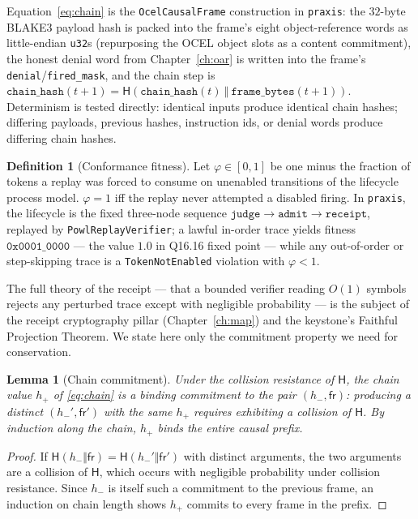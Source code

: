 \documentclass[11pt,oneside]{book}
\theoremstyle{definition}
\newtheorem{definition}{Definition}[chapter]
\theoremstyle{plain}
\newtheorem{lemma}[theorem]{Lemma}
\theoremstyle{remark}
\newcommand{\chainH}{\mathsf{H}}               %
\newcommand{\Fitness}{\varphi}
\newcommand{\code}[1]{\texttt{#1}}
\begin{document}
Equation~\eqref{eq:chain} is the \code{OcelCausalFrame} construction in \code{praxis}: the
$32$-byte BLAKE3 payload hash is packed into the frame's eight object-reference words as
little-endian \code{u32}s (repurposing the OCEL \cite{ocel2020} object slots as a content
commitment), the honest denial word from Chapter~\ref{ch:oar} is written into the frame's
\code{denial}/\code{fired\_mask}, and the chain step is
$\code{chain\_hash}(t{+}1)=\chainH(\code{chain\_hash}(t)\ \Vert\ \code{frame\_bytes}(t{+}1))$.
Determinism is tested directly: identical inputs produce identical chain hashes; differing
payloads, previous hashes, instruction ids, or denial words produce differing chain hashes.

\begin{definition}[Conformance fitness]\label{def:fit}
Let $\Fitness\in[0,1]$ be one minus the fraction of tokens a replay was forced to consume on
unenabled transitions of the lifecycle process model. $\Fitness=1$ iff the replay never
attempted a disabled firing. In \code{praxis}, the lifecycle is the fixed three-node
sequence $\code{judge}\to\code{admit}\to\code{receipt}$, replayed by
\code{PowlReplayVerifier}; a lawful in-order trace yields fitness $\code{0x0001\_0000}$ ---
the value $1.0$ in Q16.16 fixed point --- while any out-of-order or step-skipping trace is a
\code{TokenNotEnabled} violation with $\Fitness<1$.
\end{definition}

The full theory of the receipt --- that a bounded verifier reading $O(1)$ symbols rejects any
perturbed trace except with negligible probability --- is the subject of the receipt
cryptography pillar (Chapter~\ref{ch:map}) and the keystone's Faithful Projection Theorem. We
state here only the commitment property we need for conservation.

\begin{lemma}[Chain commitment]\label{lem:commit}
Under the collision resistance of $\chainH$, the chain value $h_{+}$ of \eqref{eq:chain} is a
binding commitment to the pair $(h_{-},\mathsf{fr})$: producing a distinct $(h_{-}',\mathsf{fr}')$
with the same $h_{+}$ requires exhibiting a collision of $\chainH$. By induction along the
chain, $h_{+}$ binds the entire causal prefix.
\end{lemma}

\begin{proof}
If $\chainH(h_{-}\Vert\mathsf{fr})=\chainH(h_{-}'\Vert\mathsf{fr}')$ with distinct arguments,
the two arguments are a collision of $\chainH$, which occurs with negligible probability under
collision resistance. Since $h_{-}$ is itself such a commitment to the previous frame, an
induction on chain length shows $h_{+}$ commits to every frame in the prefix. \end{proof}
\end{document}
